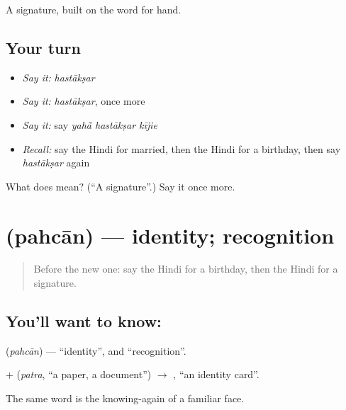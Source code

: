 \begin{grammarlens}[title={What you've built}]
A signature, built on the word for hand.
\end{grammarlens}

\subsection*{Your turn}
\begin{itemize}
\raggedright
  \item \emph{Say it:} \emph{hastākṣar}
  \item \emph{Say it:} \emph{hastākṣar}, once more
  \item \emph{Say it:} say \emph{yahā̃ hastākṣar kījie}
  \item \emph{Recall:} say the Hindi for married, then the Hindi for a birthday, then say \emph{hastākṣar} again
\end{itemize}

\begin{tcolorbox}[breakable,colback=teal!4,colframe=teal!35!black,title={Before you move on}]
What does  mean? (\textquotedblleft{}A signature\textquotedblright{}.) Say it once more.
\end{tcolorbox}
\section[\texorpdfstring{\hi{पहचान} (pahcān)}{पहचान (pahcān)}]{ (pahcān) — identity; recognition}

\label{lesson:HI-C120-pahchan}



\begin{quote}
Before the new one: say the Hindi for a birthday, then the Hindi for a signature.
\end{quote}

\subsection*{You'll want to know: }
\textbf{} (\emph{pahcān}) — \textquotedblleft{}identity\textquotedblright{}, and \textquotedblleft{}recognition\textquotedblright{}.

\textbf{} + \textbf{} (\emph{patra}, \textquotedblleft{}a paper, a document\textquotedblright{}) $\to$ \textbf{ }, \textquotedblleft{}an identity card\textquotedblright{}.

The same word is the knowing-again of a familiar face.

